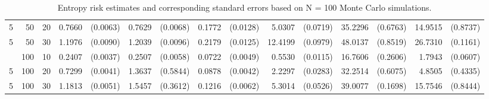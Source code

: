 \begin{table}[ht]
\begin{small}
\begin{tabular}{lrr|rr|rr|rr|rr|rr|rr}
  5 & 50 & 20 & 0.7660 & (0.0063) & 0.7629 & (0.0068) & 0.1772 & (0.0128) & 5.0307 & (0.0719) & 35.2296 & (0.6763) & 14.9515 & (0.8737) \\ 
  5 & 50 & 30 & 1.1976 & (0.0090) & 1.2039 & (0.0096) & 0.2179 & (0.0125) & 12.4199 & (0.0979) & 48.0137 & (0.8519) & 26.7310 & (0.1161) \\ 
\hdashline
  5 & 100 & 10 & 0.2407 & (0.0037) & 0.2507 & (0.0058) & 0.0722 & (0.0049) & 0.5530 & (0.0115) & 16.7606 & (0.2606) & 1.7943 & (0.0607) \\ 
  5 & 100 & 20 & 0.7299 & (0.0041) & 1.3637 & (0.5844) & 0.0878 & (0.0042) & 2.2297 & (0.0283) & 32.2514 & (0.6075) & 4.8505 & (0.4335) \\ 
  5 & 100 & 30 & 1.1813 & (0.0051) & 1.5457 & (0.3612) & 0.1216 & (0.0062) & 5.3014 & (0.0526) & 39.0077 & (0.1698) & 15.7546 & (0.8444) \\ 
   \hline
\end{tabular}
\end{small}
\caption{Entropy risk estimates and corresponding standard errors based on N = 100 Monte Carlo simulations.} 
\end{table}
